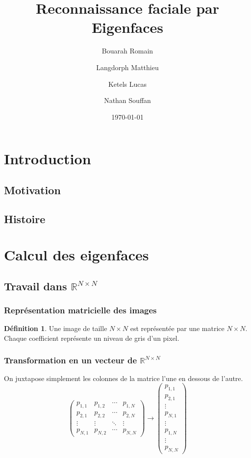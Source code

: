 \documentclass{beamer}
\title{Reconnaissance faciale par Eigenfaces}
\author{Bouarah Romain \and Langdorph Matthieu \and Ketels Lucas \and Nathan Souffan }
\date{\today}
\theoremstyle{plain}
\theoremstyle{definition}
\newtheorem{defi}{Définition}
\begin{document}
\begin{frame}[plain]
  \titlepage
\end{frame}


\begin{frame}[shrink]
  \tableofcontents
\end{frame}


\section{Introduction}
\subsection{Motivation}
\subsection{Histoire}

\section{Calcul des eigenfaces}
\subsection{Travail dans $\mathbb{R}^{N \times N}$}
\begin{frame}
  \frametitle{Représentation matricielle des images}
  \begin{defi}
    Une image de taille $N \times N$ est représentée par une matrice $N \times N$.\\
    Chaque coefficient représente un niveau de gris d'un pixel.
  \end{defi}
\end{frame}

\begin{frame}
  \frametitle{Transformation en un vecteur de $\mathbb{R}^{N \times N}$}
  On juxtapose simplement les colonnes de la matrice l'une en dessous de l'autre.
  \[
    \begin{pmatrix}
      p_{1,1} & p_{1,2} & \cdots & p_{1,N} \\
      p_{2,1} & p_{2,2} & \cdots & p_{2,N} \\
      \vdots  & \vdots  & \ddots & \vdots  \\
      p_{N,1} & p_{N,2} & \cdots & p_{N,N}
    \end{pmatrix}
    \rightarrow
    \begin{pmatrix}
      p_{1,1} \\
      p_{2,1} \\
      \vdots \\
      p_{N,1} \\
      \vdots \\
      p_{1,N} \\
      \vdots \\
      p_{N,N}
    \end{pmatrix}
  \]
  
\end{frame}
\end{document}
